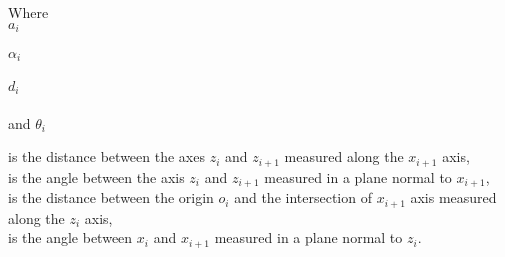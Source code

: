 \begin{minipage}[t]{0.20\textwidth}
Where\\
\hspace*{8mm} $a_i$ \\\\
\hspace*{8mm} $\alpha_i$ \\\\
\hspace*{8mm} $d_i$ \\\\
and \hspace*{0.7mm} $\theta_i$	
\end{minipage}
\begin{minipage}[t]{0.68\textwidth}
\vspace*{2mm}
is the distance between the axes $z_i$ and $z_{i+1}$ measured along the $x_{i+1}$ axis,\\
is the angle between the axis $z_i$ and $z_{i+1}$ measured in a plane normal to $x_{i+1}$,\\
is the distance between the origin $o_i$ and the intersection of $x_{i+1}$ axis measured along the $z_i$ axis,\\
is the angle between $x_i$ and $x_{i+1}$ measured in a plane normal to $z_i$.
\end{minipage}







%


